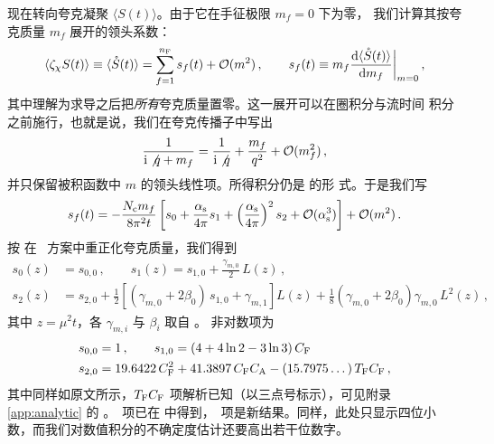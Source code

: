 现在转向夸克凝聚 $\langle S(t)\rangle$。由于它在手征极限 $m_f=0$ 下为零，
我们计算其按夸克质量 $m_f$ 展开的领头系数：
\begin{align}
  \left\langle \zeta_\chi S(t) \right\rangle \equiv \langle
  \mathring{S}(t) \rangle = \sum_{f=1}^{\NF} s_f(t) + \mathcal{O}(m^2)\,,\qquad
  s_f(t) \equiv m_f\dderiv{\langle
    \mathring{S}(t)\rangle}{m_f}\bigg|_{m=0}\,,
  \label{eq:sring}
\end{align}
其中理解为求导之后把\textit{所有}夸克质量置零。这一展开可以在圈积分与流时间
积分之前施行，也就是说，我们在夸克传播子中写出
\begin{equation}
  \begin{split}
    \frac{1}{\mathrm{i}\slashed{q}+m_f} =
    \frac{1}{\mathrm{i}\slashed{q}} + \frac{m_f}{q^2} +
    \mathcal{O}(m_f^2)\,,
    \label{eq:massexp}
  \end{split}
\end{equation}
并只保留被积函数中 $m$ 的领头线性项。所得积分仍是  的形
式。于是我们写
\begin{equation}
  s_f(t) = - \frac{\NC m_f}{8\pi^2t} \left[s_0 + \frac{\alphas}{4\pi} s_1 +
    \left(\frac{\alphas}{4\pi}\right)^2 s_2 +
    \mathcal{O}(\alphas^3)\right] + \mathcal{O}(m^2) \,.
\end{equation}
按  在 \msbar\ 方案中重正化夸克质量，我们得到
\begin{equation}
  \begin{split}
    s_0(z) &= s_{0,0}\,,\qquad
    s_1(z) = s_{1,0} + \frac{\gamma_{m,0}}{2}\,L(z)\,,\\
    s_2(z) &= s_{2,0} + \frac{1}{2}\left[(\gamma_{m,0}+2\beta_0)\,s_{1,0} +
      \gamma_{m,1}\right]L(z) +
    \frac{1}{8}(\gamma_{m,0}+2\beta_0)\gamma_{m,0}\,L^2(z)\,,
    \label{eq:sfull}
  \end{split}
\end{equation}
其中 $z=\mu^2t$，各 $\gamma_{m,i}$ 与 $\beta_i$ 取自 。
非对数项为
\begin{equation}
  \begin{split}
    s_{0,0} &= 1\,,\qquad
    s_{1,0} = \left(4 + 4 \ln 2 - 3 \ln 3\right) \CF\\
    s_{2,0} &= 19.6422\, \CF^2 + 41.3897\, \CF \CA - (15.7975\dots)\, \TF \CF\,,
    \label{eq:sconst}
  \end{split}
\end{equation}
其中同样如原文所示，$\TF\CF$ 项解析已知（以三点号标示），可见附录
\,\ref{app:analytic} 的 。\nlo\ 项已在
 中得到，\nnlo\ 项是新结果。同样，此处只显示四位小
数，而我们对数值积分的不确定度估计还要高出若干位数字。

